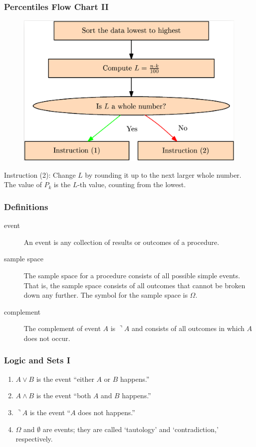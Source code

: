 \documentclass[xcolor=dvipsnames]{beamer}
\begin{document}
\begin{frame}
  \frametitle{Percentiles Flow Chart II}
\begin{figure}[h]
\includegraphics[scale=.15]{./diagrams/percentile.png}
\end{figure}
Instruction (2): Change $L$ by rounding it up to the next larger
whole number. The value of $P_{k}$ is the $L$-th value, counting
from the lowest.
\end{frame}

\begin{frame}
  \frametitle{Definitions}
  \begin{description}
  \item[event] An event is any collection of results or outcomes of a
    procedure.
  \item[sample space] The sample space for a procedure consists of all
    possible simple events. That is, the sample space consists of all
    outcomes that cannot be broken down any further. The symbol for
    the sample space is $\Omega$. 
  \item[complement] The complement of event $A$ is $\urcorner{}A$ and
    consists of all outcomes in which $A$ does not occur.
  \end{description}
\end{frame}

\begin{frame}
  \frametitle{Logic and Sets I}
  \begin{enumerate}
  \item<1-> $A\vee{}B$ is the event ``either $A$ or $B$ happens.''
  \item<2-> $A\wedge{}B$ is the event ``both $A$ and $B$ happens.''
  \item<3-> $\urcorner{}A$ is the event ``$A$ does not happens.''
  \item<4-> $\Omega$ and $\emptyset$ are events; they are called
    `tautology' and `contradiction,' respectively.
  \end{enumerate}
\end{frame}
\end{document}
